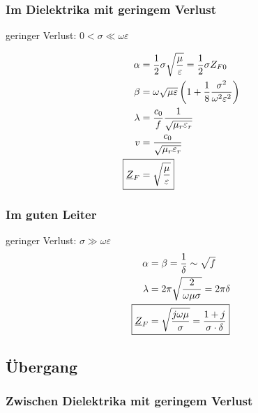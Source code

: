 \subsubsection{Im Dielektrika mit geringem Verlust}
geringer Verlust: $0 < \sigma \ll\omega\varepsilon$

\begin{align*}
    \alpha                  & = \dfrac{1}{2}\sigma\sqrt{\dfrac{\mu}{\varepsilon}} = \frac{1}{2}\sigma Z_{F0}                  \\
    \beta                   & = \omega\sqrt{\mu\varepsilon}\left(1+\dfrac{1}{8}\dfrac{\sigma^2}{\omega^2\varepsilon^2}\right) \\
    \lambda                 & = \dfrac{c_0}{f}\dfrac{1}{\sqrt{\mu_r\varepsilon_r}}                                            \\
    v                       & = \dfrac{c_0}{\sqrt{\mu_r\varepsilon_r}}                                                        \\
    \Aboxed{\underline{Z}_F & = \sqrt{\dfrac{\mu}{\varepsilon}}}
\end{align*}

\subsubsection{Im guten Leiter}
geringer Verlust: $\sigma \gg\omega\varepsilon$
\begin{align*}
    \alpha                  & = \beta = \dfrac{1}{\delta} \sim \sqrt{f}                             \\
    \lambda                 & = 2\pi \sqrt{\dfrac{2}{\omega\mu\sigma}}=2\pi\delta                   \\
    \Aboxed{\underline{Z}_F & = \sqrt{\dfrac{j\omega\mu}{\sigma}} = \dfrac{1+j}{\sigma\cdot\delta}}
\end{align*}

\subsection{Übergang}
\subsubsection{Zwischen Dielektrika mit geringem Verlust}

